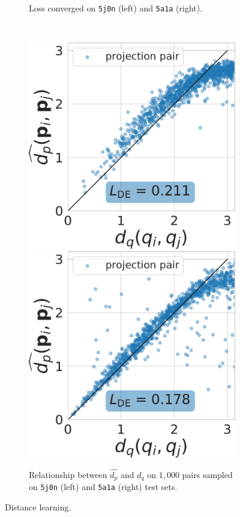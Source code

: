 \begin{figure}
\begin{minipage}[b]{0.45\linewidth}
\begin{subfigure}[b]{\linewidth}
            \caption{Loss converged on \texttt{5j0n} (left) and \texttt{5a1a} (right).
            \vspace{0.8em}}%
            \label{fig:distance-learning:loss}
        \end{subfigure}
        \\ %
        \begin{subfigure}[b]{\linewidth}
            \centering
            \includegraphics[width=0.40\linewidth]{figures/dPdQ_5j0n_fullcvg_uniformS2_noise0.pdf}
            \hspace{0.5cm}
            \includegraphics[width=0.40\linewidth]{figures/dPdQ_5a1a_quartercvg_uniformS2_noise0.pdf}
            \caption{Relationship between $\widehat{d_p}$ and $d_q$ on $1,000$ pairs sampled on \texttt{5j0n} (left) and \texttt{5a1a} (right) test sets.
            }\label{fig:distance-learning:dpdq}
        \end{subfigure}
        \caption{Distance learning.}
    \end{minipage}
\end{figure}

